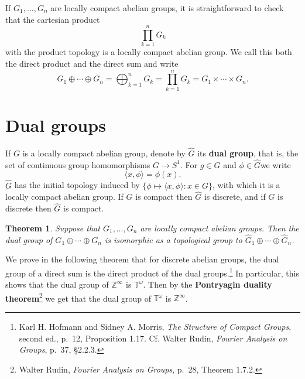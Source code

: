 \documentclass{article}
\newcommand{\inner}[2]{\langle #1, #2 \rangle}
\newtheorem{theorem}{Theorem}
\begin{document}
If $G_1,\ldots,G_n$ are locally compact abelian groups, it is straightforward to check that the cartesian product
\[
\prod_{k=1}^n G_k
\]
with the product topology is a locally compact abelian group. We call this both the direct product and the direct sum
and write
\[
G_1 \oplus \cdots \oplus G_n = \bigoplus_{k=1}^n G_k = \prod_{k=1}^n G_k = G_1 \times \cdots \times G_n.
\]


\section{Dual groups}
If $G$ is a locally compact abelian group, denote by $\widehat{G}$ its \textbf{dual group}, that is, the set of continuous group homomorphisms $G \to S^1$.
For $g \in G$ and $\phi \in \widehat{G}$we write
\[
\inner{x}{\phi} = \phi(x).
\]
$\widehat{G}$ has the initial topology induced by $\{\phi \mapsto \inner{x}{\phi}: x \in G\}$, with which it is a locally compact abelian group. If $G$ is compact then
$\widehat{G}$ is discrete, and if $G$ is discrete then $\widehat{G}$ is compact.


\begin{theorem}
Suppose that $G_1,\ldots,G_n$ are locally compact abelian groups. Then the dual
group of  $G_1 \oplus \cdots \oplus G_n$ is
isomorphic as a topological group to  $\widehat{G}_1 \oplus \cdots \oplus \widehat{G}_n$.
\end{theorem}

We prove in the following theorem that for discrete abelian groups, the dual group of a direct sum is the direct product of the dual groups.\footnote{Karl H. Hofmann and Sidney A. Morris, {\em The Structure of Compact Groups}, second ed., p.~12, Proposition 1.17. Cf. Walter Rudin, {\em Fourier Analysis on Groups}, p.~37, \S 2.2.3.}
In particular, this shows that the dual group of $\mathbb{Z}^\infty$ is $\mathbb{T}^\omega$. Then by the \textbf{Pontryagin duality theorem}\footnote{Walter
Rudin, {\em Fourier Analysis on Groups}, p.~28, Theorem 1.7.2.}
we get that the dual group of $\mathbb{T}^\omega$ is $\mathbb{Z}^\infty$.
\end{document}
